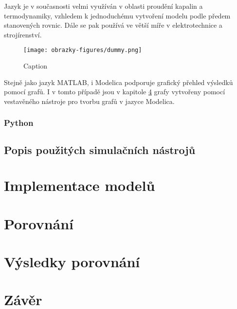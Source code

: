 Jazyk je v současnosti velmi využíván v oblasti proudění kapalin a termodynamiky, vzhledem k jednoduchému vytvoření modelu podle předem stanovených rovnic. Dále se pak používá ve větší míře v elektrotechnice a strojírenství.
\begin{figure}
    \centering
    \texttt{[image: obrazky-figures/dummy.png]}
    \caption{Caption}
    \label{fig:my_label}
\end{figure}

Stejně jako jazyk MATLAB, i Modelica podporuje grafický přehled výsledků pomocí grafů. I v tomto případě jsou v kapitole \ref{kapitola6} grafy vytvořeny pomocí vestavěného nástroje pro tvorbu grafů v jazyce Modelica.


\subsection{Python}


\section{Popis použitých simulačních nástrojů}

\chapter{Implementace modelů}
\label{kapitola4}

\chapter{Porovnání}
\label{kapitola5}

\chapter{Výsledky porovnání}
\label{kapitola6}

\chapter{Závěr}
\label{kapitola7}


